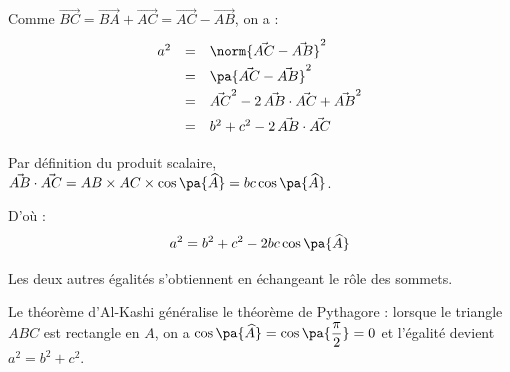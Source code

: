 \begin{demonstration}
	Comme $\vec{BC} =\vec{BA} + \vec{AC} = \vec{AC} - \vec{AB}$, on a :
	\[
		\def\arraystretch{1.5}
		\begin{array}{rcl}
			a^2 & = & \norm{\vec{AC} - \vec{AB}}^2                         \\
			    & = & \pa{\vec{AC} - \vec{AB}}^2                           \\
			    & = & \vec{AC}^2 - 2\,\vec{AB} \cdot \vec{AC} + \vec{AB}^2 \\
			    & = & b^2 + c^2 - 2\,\vec{AB} \cdot \vec{AC}
		\end{array}
	\]

	Par définition du produit scalaire, $\vec{AB} \cdot \vec{AC} = AB \times AC \times \cos\pa{\widehat{A}} = bc\cos\pa{\widehat{A}}$.

	D'où :
	\[
		a^2 = b^2 + c^2 - 2bc\cos\pa{\widehat{A}}
	\]

	Les deux autres égalités s'obtiennent en échangeant le rôle des sommets.
\end{demonstration}

\begin{rem}
	Le théorème d'Al-Kashi généralise le théorème de Pythagore : lorsque le triangle $ABC$ est rectangle en $A$, on a $\cos\pa{\widehat{A}} = \cos\pa{\dfrac{\pi}{2}} = 0$ et l'égalité devient $a^2 = b^2 + c^2$.
\end{rem}

